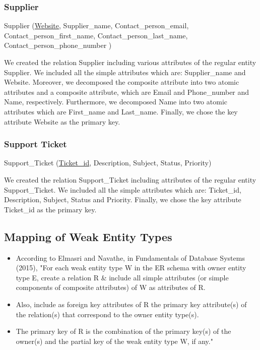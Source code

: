 \documentclass[11pt]{article}
\begin{document}
\subsubsection{Supplier}

Supplier (\underline{Website}, Supplier\_name, Contact\_person\_email, \\
Contact\_person\_first\_name, Contact\_person\_last\_name, Contact\_person\_phone\_number )

We created the relation Supplier including various attributes of the regular entity Supplier. We included all the simple attributes which are: Supplier\_name and Website. Moreover, we decomposed the composite attribute into two atomic attributes and a composite attribute, which are Email and Phone\_number and Name, respectively. Furthermore, we decomposed Name into two atomic attributes which are First\_name and Last\_name. Finally, we chose the key attribute Website as the primary key.

\subsubsection{Support Ticket}

Support\_Ticket (\underline{Ticket\_id}, Description, Subject, Status, Priority)

We created the relation Support\_Ticket including attributes of the regular entity Support\_Ticket. We included all the simple attributes which are: Ticket\_id, Description, Subject, Status and Priority.  Finally, we chose the key attribute Ticket\_id as the primary key.

\subsection{Mapping of Weak Entity Types}

\begin{itemize}
  \item	According to Elmasri and Navathe, in Fundamentals of Database Systems (2015), "For each weak entity type W in the ER schema with owner entity type E, create a relation R \& include all simple attributes (or simple components of composite attributes) of W as attributes of R.
  \item	Also, include as foreign key attributes of R the primary key attribute(s) of the relation(s) that correspond to the owner entity type(s).
  \item	The primary key of R is the combination of the primary key(s) of the owner(s) and the partial key of the weak entity type W, if any." \cite{elmasri}
\end{itemize}
\end{document}
